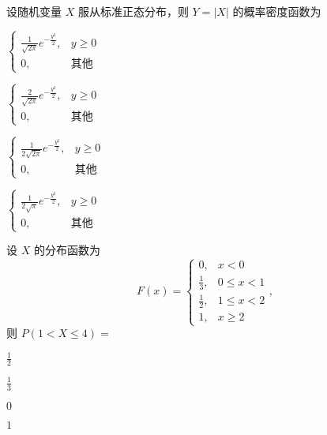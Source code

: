\documentclass{exam-zh}
\begin{document}
\begin{question}
  设随机变量 $X$ 服从标准正态分布，则 $Y = |X|$ 的概率密度函数为 \paren[B]
  \begin{choices}
    \item 
    $
    \begin{cases} 
    \frac{1}{\sqrt{2\pi}} e^{-\frac{y^2}{2}}, & y \geq 0 \\ 
    0, & \text{其他} 
    \end{cases}
    $
    
    \item 
    $
    \begin{cases} 
    \frac{2}{\sqrt{2\pi}} e^{-\frac{y^2}{2}}, & y \geq 0 \\ 
    0, & \text{其他} 
    \end{cases}
    $
    
    \item 
    $
    \begin{cases} 
    \frac{1}{2\sqrt{2\pi}} e^{-\frac{y^2}{2}}, & y \geq 0 \\ 
    0, & \text{其他} 
    \end{cases}
    $
    
    \item 
    $
    \begin{cases} 
    \frac{1}{2\sqrt{\pi}} e^{-\frac{y^2}{2}}, & y \geq 0 \\ 
    0, & \text{其他} 
    \end{cases}
    $
  \end{choices}
\end{question}

\begin{question}
  设 $X$ 的分布函数为  
  $$F(x) = 
  \begin{cases} 
  0, & x < 0 \\ 
  \frac{1}{3}, & 0 \leq x < 1 \\ 
  \frac{1}{2}, & 1 \leq x < 2 \\ 
  1, & x \geq 2 
  \end{cases},$$  
  则  
  $P(1 < X \leq 4) = $ \paren[A]
  \begin{choices}
    \item $\frac{1}{2}$  
    \item $\frac{1}{3}$  
    \item $0$  
    \item $1$  
  \end{choices}
\end{question}
\end{document}
